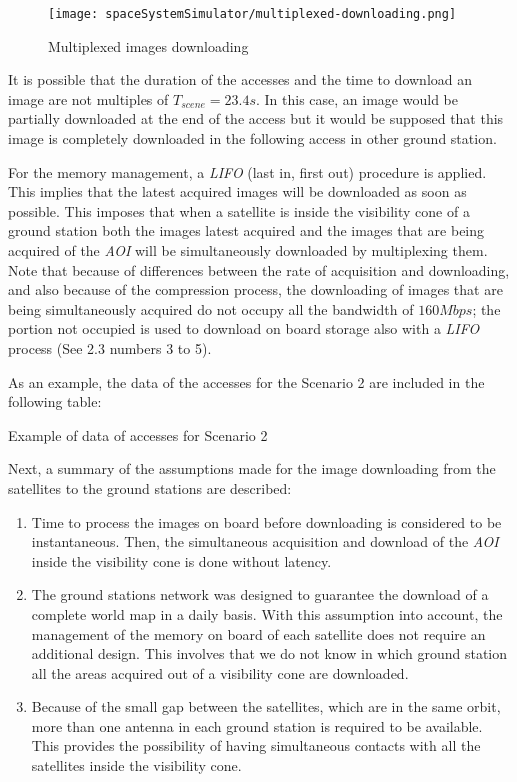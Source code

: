 \begin{figure}[!h]
\begin{center}
\texttt{[image: spaceSystemSimulator/multiplexed-downloading.png]}
\caption{Multiplexed images downloading}
\label{fig:sss-multiplexed-downloading}
\end{center}
\end{figure}



It is possible that the duration of the accesses and the time to download an image are not multiples of $T_{scene}=23.4s$. In this case, an image would be partially downloaded at the end of the access but it would be supposed that this image is completely downloaded in the following access in other ground station. 

For the memory management, a \emph{LIFO} (last in, first out) procedure is
applied. This implies that the latest acquired images will be downloaded as soon
as possible. This imposes that when a satellite is inside the visibility cone of
a ground station both the images latest acquired and the images that are being
acquired of the \emph{AOI} will be simultaneously downloaded by multiplexing
them. Note that because of differences between the rate of acquisition and
downloading, and also because of the compression process, the downloading of
images that are being simultaneously acquired do not occupy all the bandwidth of
$160Mbps$; the portion not occupied is used to download on board storage also
with a \emph{LIFO} process (See 2.3 numbers 3 to 5).


As an example, the data of the accesses for the Scenario 2 are included in the
following table:


\begin{table}[hp]
  \centering
  {\small
  
  }
  \caption{Example of data of accesses for Scenario 2}
  \label{table:sss-accesses-scenario2}
\end{table}


Next, a summary of the assumptions made for the image downloading from the
satellites to the ground stations are described:
\begin{enumerate}
\item Time to process the images on board before downloading is considered to be instantaneous. Then, the simultaneous acquisition and download of the \emph{AOI} inside the visibility cone is done without latency.
\item The ground stations network was designed to guarantee the download of a complete world map in a daily basis. With this assumption into account, the management of the memory on board of each satellite does not require an additional design. This involves that we do not know in which ground station all the areas acquired out of a visibility cone are downloaded. 
\item Because of the small gap between the satellites, which are in the same orbit, more than one antenna in each ground station is required to be available. This provides the possibility of having simultaneous contacts with all the satellites inside the visibility cone.
\end{enumerate}


